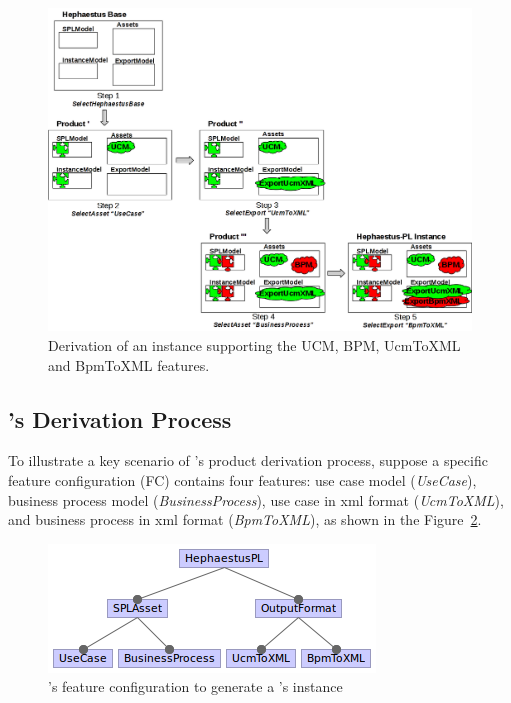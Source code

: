 
\begin{figure}[t!]
\begin{center}
\includegraphics[width=\textwidth]{imagens/derivation.png}
\end{center}
\caption{Derivation of an \hpl{} instance supporting the UCM, BPM, UcmToXML and BpmToXML features.}
\label{fig:derivationHPL}
\end{figure}


\subsection{\hpl's Derivation Process} 
\label{sec:hpl-derivation}

To illustrate a key scenario of \hpl's product derivation process, suppose a specific feature configuration (FC) contains four features: use case model (\emph{UseCase}), business process model (\emph{BusinessProcess}), use case in xml format (\emph{UcmToXML}), and business process in xml format (\emph{BpmToXML}), as shown in the Figure~\ref{fig:fc-ucm-bpm}.


\begin{figure}[t!]
\begin{center}
\includegraphics[scale=0.8]{imagens/fc-ucm-bpm.png}
\end{center}
\caption{\hpl's feature configuration to generate a \hpl's instance}
\label{fig:fc-ucm-bpm}
\end{figure}

